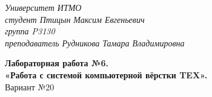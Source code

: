 \begin{flushright}
\textit{Университет ИТМО} \\
\textit{студент Птицын Максим Евгеньевич} \\
\textit{группа P3130} \\
\textit{преподаватель Рудникова Тамара Владимировна} \\
\end{flushright}
\vspace{3 cm}
\begin{center}
\large
\textbf{Лабораторная работа №6.} \\
\textbf{«Работа с системой
компьютерной вёрстки TEX».} \\
Вариант №20
\end{center}